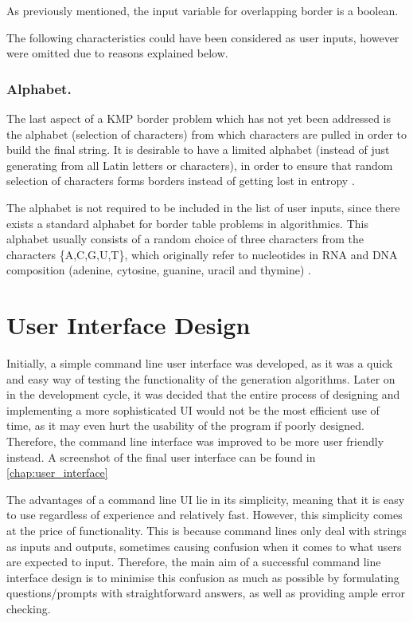 \documentclass{l4proj}
\begin{document}
As previously mentioned, the input variable for overlapping border is a boolean.

The following characteristics could have been considered as user inputs, however were omitted due to reasons explained below.

\subsubsection{Alphabet.}
\label{sec:alphabet}

The last aspect of a KMP border problem which has not yet been addressed is the alphabet (selection of characters) from which characters are pulled in order to build the final string. It is desirable to have a limited alphabet (instead of just generating from all Latin letters or characters), in order to ensure that random selection of characters forms borders instead of getting lost in entropy \cite{a}.
 
The alphabet is not required to be included in the list of user inputs, since there exists a standard alphabet for border table problems in algorithmics. This alphabet usually consists of a random choice of three characters from the characters \{A,C,G,U,T\}, which originally refer to nucleotides in RNA and DNA composition (adenine, cytosine, guanine, uracil and thymine) \cite{a}.

\section{User Interface Design}

Initially, a simple command line user interface was developed, as it was a quick and easy way of testing the functionality of the generation algorithms. Later on in the development cycle, it was decided that the entire process of designing and implementing a more sophisticated UI would not be the most efficient use of time, as it may even hurt the usability of the program if poorly designed. Therefore, the command line interface was improved to be more user friendly instead. A screenshot of the final user interface can be found in \autoref{chap:user_interface}

The advantages of a command line UI lie in its simplicity, meaning that it is easy to use regardless of experience and relatively fast. However, this simplicity comes at the price of functionality. This is because command lines only deal with strings as inputs and outputs, sometimes causing confusion when it comes to what users are expected to input. Therefore, the main aim of a successful command line interface design is to minimise this confusion as much as possible by formulating questions/prompts with straightforward answers, as well as providing ample error checking.
\end{document}
